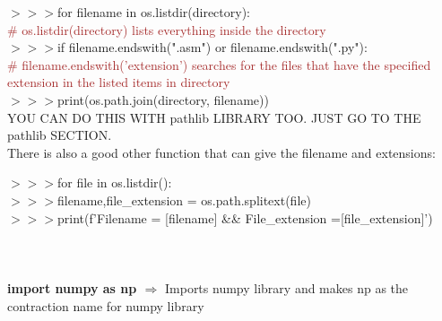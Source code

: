 \documentclass[a4paper,18pt]{article}
\begin{document}
$>>>$for filename in os.listdir(directory):\\{\textcolor{brown}{\# os.listdir(directory) lists everything inside the directory}}\\

$>>>$\hspace*{28pt}if filename.endswith(".asm") or filename.endswith(".py"):\\{\textcolor{brown}{\# filename.endswith('extension') searches for the files that have the specified extension in the listed items in directory}}\\

$>>>$\hspace*{42pt}print(os.path.join(directory, filename))\\

YOU CAN DO THIS WITH pathlib LIBRARY TOO. JUST GO TO THE pathlib SECTION.\\

There is also a good other function that can give the filename and extensions:

$>>>$for file in os.listdir():\\

$>>>$\hspace*{28pt}filename,file\_extension = os.path.splitext(file)\\

$>>>$\hspace*{28pt}print(f'Filename = {[filename]} \&\& File\_extension ={[file\_extension]}')\\\\


\newpage

\section{\colorbox {Abi}{}}
\subsection{\colorbox {matgreen}{\color{white}{\large import numpy as np}}}
\textbf{import numpy as np $\Rightarrow$} Imports numpy library and makes np as the contraction name for numpy library\\\\
\end{document}
